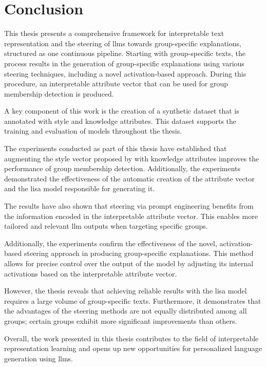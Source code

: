 \chapter{Conclusion}
\label{sec:conclusion}
This thesis presents a comprehensive framework for interpretable text representation and the steering of \acp{llm} towards group-specific explanations, structured as one continuous pipeline. Starting with group-specific texts, the process results in the generation of group-specific explanations using various steering techniques, including a novel activation-based approach. During this procedure, an interpretable attribute vector that can be used for group membership detection is produced.

A key component of this work is the creation of a synthetic dataset that is annotated with style and knowledge attributes. This dataset supports the training and evaluation of models throughout the thesis.

The experiments conducted as part of this thesis have established that augmenting the style vector proposed by \citet{patelLearningInterpretableStyle2023} with knowledge attributes improves the performance of group membership detection. Additionally, the experiments demonstrated the effectiveness of the automatic creation of the attribute vector and the \ac{lisa} model responsible for generating it.

The results have also shown that steering via prompt engineering benefits from the information encoded in the interpretable attribute vector. This enables more tailored and relevant \ac{llm} outputs when targeting specific groups.

Additionally, the experiments confirm the effectiveness of the novel, activation-based steering approach in producing group-specific explanations. This method allows for precise control over the output of the model by adjusting its internal activations based on the interpretable attribute vector.

However, the thesis reveals that achieving reliable results with the \ac{lisa} model requires a large volume of group-specific texts. Furthermore, it demonstrates that the advantages of the steering methods are not equally distributed among all groups; certain groups exhibit more significant improvements than others.

Overall, the work presented in this thesis contributes to the field of interpretable representation learning and opens up new opportunities for personalized language generation using \aclp{llm}.


